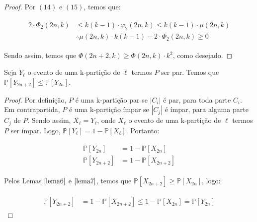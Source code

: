 \documentclass[12pt]{article}
\begin{document}
\begin{proof}
  	 Por $(14)$ e $(15)$, temos que:
  	 
  	 \begin{align}
  	 	\begin{split}
  	 		2 \cdot \Phi_2(2n, k) & \leq k(k-1) \cdot \varphi_2(2n, k) \leq k(k-1) \cdot \mu(2n, k) \\
  	 		& \therefore \mu(2n, k)\cdot k  (k-1) - 2 \cdot \Phi_2(2n, k) \geq 0
  	 	\end{split} 
  	 \end{align} 
  	 
  	 Sendo assim, temos que $\Phi(2n+2, k) \geq \Phi(2n, k) \cdot k^2$, como desejado.
  	 
  \end{proof} \newl
  
   \begin{lema}  
  	\label{lema8} 
  	Seja $Y_\ell$ o evento de uma k-partição de $\ell$ termos $P$ ser par. Temos que $\mathds{P}[Y_{2n+2}] \leq \mathds{P}[Y_{2n}]$.
  \end{lema}
  
  \begin{proof} 
  	Por definição, $P$ é uma k-partição par se $|C_i|$ é par, para toda parte $C_i$. Em contrapartida, $P$ é uma k-partição ímpar se $|C_j|$ é ímpar, para alguma parte $C_j$ de $P$. Sendo assim, $\overline{X_\ell} = Y_\ell$, onde $X_\ell$ o evento de uma k-partição de $\ell$ termos $P$ ser ímpar. Logo, $\mathds{P}[Y_{\ell}] = 1 - \mathds{P}[X_{\ell}]$. Portanto: 
  	
  	 \begin{align}
  		\begin{split}
  			 \mathds{P}[Y_{2n}] &= 1 - \mathds{P}[X_{2n}] \ \    \\ 
  			 \mathds{P}[Y_{2n+2}] &= 1 - \mathds{P}[X_{2n+2}]
  		\end{split} 
  	\end{align} 
  	
  	Pelos Lemas $\ref{lema6}$ e $\ref{lema7}$, temos que $\mathds{P}[X_{2n+2}] \geq \mathds{P}[X_{2n}]$, logo: 
  	
  	\begin{align}
  		\begin{split} 
  			\mathds{P}[Y_{2n+2}] &= 1 - \mathds{P}[X_{2n+2}] \leq 1 -  \mathds{P}[X_{2n}] = \mathds{P}[Y_{2n}]
  		\end{split} 
  	\end{align} 
  	
  \end{proof}\newl
  
\end{document}

